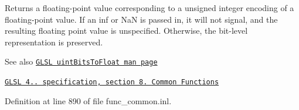 Returns a floating-\/point value corresponding to a unsigned integer encoding of a floating-\/point value. If an inf or NaN is passed in, it will not signal, and the resulting floating point value is unspecified. Otherwise, the bit-\/level representation is preserved.

\begin{DoxySeeAlso}{See also}
\href{http://www.opengl.org/sdk/docs/manglsl/xhtml/uintBitsToFloat.xml}{\tt G\+L\+SL uint\+Bits\+To\+Float man page} 

\href{http://www.opengl.org/registry/doc/GLSLangSpec.4.20.8.pdf}{\tt G\+L\+SL 4.. specification, section 8. Common Functions} 
\end{DoxySeeAlso}


Definition at line 890 of file func\+\_\+common.\+inl.

